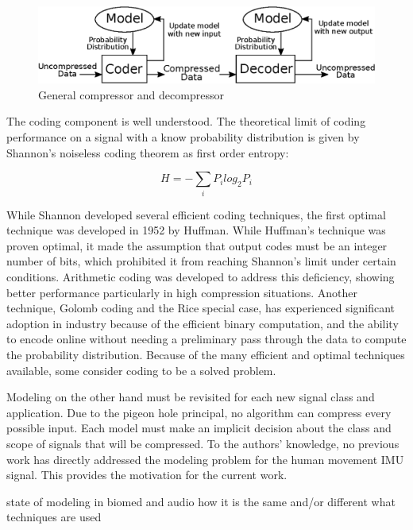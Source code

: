 \documentclass[journal]{IEEEtran}
\begin{document}
\begin{figure}
  \includegraphics[width=\linewidth]{general_compressor.eps}
  \caption{General compressor and decompressor}
  \label{fig:general_compressor}
\end{figure}

The coding component is well understood. The theoretical limit of coding performance on a signal with a know probability distribution is given by Shannon's noiseless coding theorem\cite{Shannon1948} as first order entropy:

$$H = -\sum_{i} P_ilog_2P_i$$

While Shannon developed several efficient coding techniques, the first optimal technique was developed in 1952 by Huffman\cite{Huffman1952}. While Huffman's technique was proven optimal, it made the assumption that output codes must be an integer number of bits, which prohibited it from reaching Shannon's limit under certain conditions. Arithmetic coding was developed to address this deficiency, showing better performance particularly in high compression situations\cite{Witten1987}. Another technique, Golomb coding and the Rice special case, has experienced significant adoption in industry because of the efficient binary computation, and the ability to encode online without needing a preliminary pass through the data to compute the probability distribution\cite{Golomb1966}\cite{F.Rice1979}. Because of the many efficient and optimal techniques available, some consider coding to be a solved problem\cite{Mahoney2013}.

Modeling on the other hand must be revisited for each new signal class and application. Due to the pigeon hole principal, no algorithm can compress every possible input\cite{Kolmogorov1965}. Each model must make an implicit decision about the class and scope of signals that will be compressed. To the authors' knowledge, no previous work has directly addressed the modeling problem for the human movement IMU signal. This provides the motivation for the current work.


state of modeling in biomed and audio
how it is the same and/or different
what techniques are used
\end{document}

